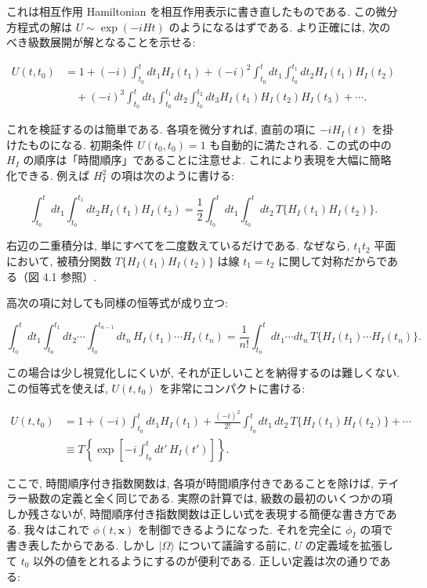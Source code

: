 \documentclass[a4paper,12pt]{article}
\begin{document}
これは相互作用 Hamiltonian を相互作用表示に書き直したものである. 
この微分方程式の解は $U \sim \exp(-iHt)$ のようになるはずである. 
より正確には, 次のべき級数展開が解となることを示せる:

\begin{align*}
U(t,t_0) &= 1 + (-i)\int_{t_0}^t dt_1 H_I(t_1) 
+ (-i)^2 \int_{t_0}^t dt_1 \int_{t_0}^{t_1} dt_2 H_I(t_1)H_I(t_2) \\
&\quad + (-i)^3 \int_{t_0}^t dt_1 \int_{t_0}^{t_1} dt_2 \int_{t_0}^{t_2} dt_3 
H_I(t_1)H_I(t_2)H_I(t_3) + \cdots . \tag{4.20}
\end{align*}

これを検証するのは簡単である. 各項を微分すれば, 直前の項に $-iH_I(t)$ を掛けたものになる. 
初期条件 $U(t_0,t_0)=1$ も自動的に満たされる. 
この式の中の $H_I$ の順序は「時間順序」であることに注意せよ. 
これにより表現を大幅に簡略化できる. 
例えば $H_I^2$ の項は次のように書ける:

\begin{equation*}
\int_{t_0}^t dt_1 \int_{t_0}^{t_1} dt_2 H_I(t_1)H_I(t_2)
= \frac{1}{2}\int_{t_0}^t dt_1 \int_{t_0}^t dt_2 \, T\{ H_I(t_1)H_I(t_2)\}. \tag{4.21}
\end{equation*}

右辺の二重積分は, 単にすべてを二度数えているだけである. なぜなら, $t_1 t_2$ 平面において, 被積分関数 $T\{H_I(t_1)H_I(t_2)\}$ は線 $t_1 = t_2$ に関して対称だからである（図 4.1 参照）.

高次の項に対しても同様の恒等式が成り立つ:

\begin{equation*}
\int_{t_0}^t dt_1 \int_{t_0}^{t_1} dt_2 \cdots \int_{t_0}^{t_{n-1}} dt_n \,
H_I(t_1)\cdots H_I(t_n)
= \frac{1}{n!}\int_{t_0}^t dt_1 \cdots dt_n \, T\{H_I(t_1)\cdots H_I(t_n)\}.
\end{equation*}

この場合は少し視覚化しにくいが, それが正しいことを納得するのは難しくない. 
この恒等式を使えば, $U(t,t_0)$ を非常にコンパクトに書ける:

\begin{align*}
U(t,t_0) &= 1 + (-i)\int_{t_0}^t dt_1 H_I(t_1)
+ \frac{(-i)^2}{2!}\int_{t_0}^t dt_1 \, dt_2 \, T\{H_I(t_1)H_I(t_2)\} + \cdots \\
&\equiv T \left\{ \exp \left[ -i \int_{t_0}^t dt' \, H_I(t') \right] \right\}. \tag{4.22}
\end{align*}

ここで, 時間順序付き指数関数は, 各項が時間順序付きであることを除けば, テイラー級数の定義と全く同じである. 実際の計算では, 級数の最初のいくつかの項しか残さないが, 時間順序付き指数関数は正しい式を表現する簡便な書き方である. 我々はこれで $\phi(t,\mathbf{x})$ を制御できるようになった. 
それを完全に $\phi_I$ の項で書き表したからである. 
しかし $\lvert \Omega \rangle$ について議論する前に, $U$ の定義域を拡張して $t_0$ 以外の値をとれるようにするのが便利である. 
正しい定義は次の通りである:
\end{document}
